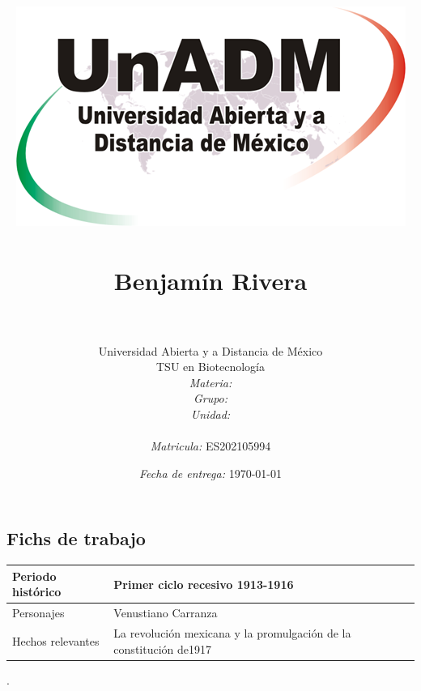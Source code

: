 \documentclass[12pt]{article}
\title{
	\includegraphics{../../../assets/logo-unadm} \\\ \\
	Benjam\'in Rivera \\
	\bf{\titulo}\\}
\author{
	Universidad Abierta y a Distancia de México \\
	TSU en Biotecnolog\'ia \\
	\textit{Materia:} \materia \\
	\textit{Grupo:} \grupo \\
	\textit{Unidad:} \unidad \\
	\\
	\textit{Matricula:} ES202105994 }
\date{\textit{Fecha de entrega:} \today}
\begin{document}
\maketitle\newpage

\subsection*{Fichs de trabajo}

	\begin{longtable}[]{@{}ll@{}}

		\begin{minipage}[b]{0.54\columnwidth}\raggedright
			Periodo histórico\strut
		\end{minipage} & 
			\begin{minipage}[b]{0.40\columnwidth}\raggedright
				Primer ciclo recesivo 1913-1916\strut
			\end{minipage}\tabularnewline
		
		\endhead
		
		\begin{minipage}[t]{0.54\columnwidth}\raggedright
			Personajes\strut
		\end{minipage} & 
			\begin{minipage}[t]{0.40\columnwidth}\raggedright
				Venustiano Carranza\strut
			\end{minipage}\tabularnewline
		
		\begin{minipage}[t]{0.54\columnwidth}\raggedright
			Hechos relevantes\strut
		\end{minipage} & 
			\begin{minipage}[t]{0.40\columnwidth}\raggedright
				La revolución mexicana y la promulgación de la constitución de1917\strut
			\end{minipage}\tabularnewline
	
	\end{longtable}.\dotfill
\end{document}
